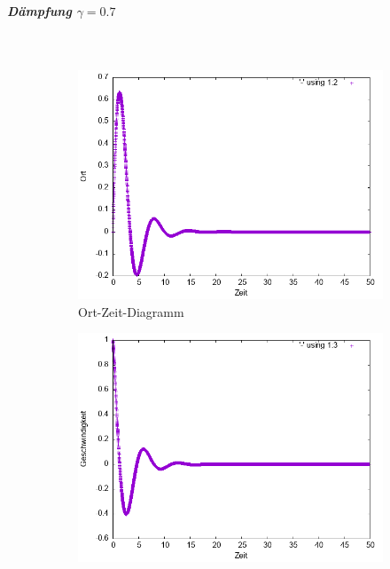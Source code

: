 \documentclass[
    oneside,
    ngerman,
    footinclude=false,
    captions=tableheading,
    DIV=12
]{scrartcl}
\begin{document}
                \subparagraph{Dämpfung $\gamma=0.7$}\,
                \begin{figure}[H]
                    \centering
                    \begin{subfigure}[b]{0.45\textwidth}
                        \centering
                        \includegraphics[width=\textwidth]{Bilddateien/VVA1(b)-001-0.7-x.png}
                        \caption{Ort-Zeit-Diagramm}
                        \label{fig:VVA1(a)-001-0.7-x}
                    \end{subfigure}
                    \hfill
                    \begin{subfigure}[b]{0.45\textwidth}
                        \centering
                        \includegraphics[width=\textwidth]{Bilddateien/VVA1(b)-001-0.7-v.png}

\end{subfigure}
\end{figure}
\end{document}
